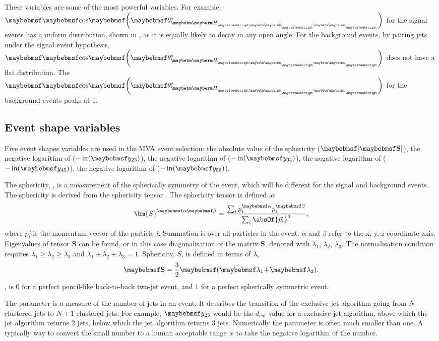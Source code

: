 These variables are some of the most powerful variables. For example, $\cosStar{\Hbb}$ for  the signal events has a unform distribution, shown in , as it is equally likely to decay in any open angle. For the background events, by pairing jets under the signal event hypothesis, $\cosStar{\Hbb}$ does not have a flat distribution. The  $\cosStar{\Hbb}$ for the background events peaks at 1.

\subsection{Event shape variables}

Five event shapes variables are used in the MVA event selection: the absolute value of the sphericity ($\abs{\sphericity}$), the negative logarithm of  ($-\ln(\y{23})$), the negative logarithm of  ($-\ln(\y{34})$), the negative logarithm of  ($-\ln(\y{45})$), the negative logarithm of  ($-\ln(\y{56})$).

The sphericity, \sphericity, is a measurement of the spherically symmetry of the event, which will be different for the signal and background events. The sphericity is  derived from the sphericity tensor \cite{PhysRevLett.35.1609}. The sphericity tensor is  defined as
\begin{equation}
{\bm{S}^{\alpha\beta}} = \frac{\sum_{i}p^{\alpha}_{i}p^{\beta}_{i}}{\sum_{i}\absOf{\vec{p_{i}}}^2},
\end{equation}
where $\vec{p_{i}}$ is the momentum vector of the particle $i$. Summation is over all particles in the event. $\alpha$ and $\beta$ refer to the x, y, z coordinate axis. Eigenvalues of tensor $\bm{S}$ can be found, or in this case diagonalisation of the matrix $\bm{S}$, denoted with $\lambda_{1}$, $\lambda_{2}$, $\lambda_{3}$. The normalisation condition requires $\lambda_{1}\!\geqslant\! \lambda_{2} \! \geqslant \! \lambda_{3}$ and $ \lambda_{1} \! + \! \lambda_{2} \! + \! \lambda_{3} \! = \! 1 $. Sphericity, $S$, is defined in terms of $\lambda$,
\begin{equation}
\sphericity = \frac{3}{2}\parenths{\lambda_{1} \! + \! \lambda_{2}}.
\end{equation}
\sphericity, is 0 for a perfect pencil-like back-to-back two-jet event, and 1 for a perfect spherically symmetric event.

The \y{} parameter is a measure of the number of jets in an event.  It describes the transition of  the exclusive jet algorithm going from $N$ clustered jets to $N\!+\!1$ clustered jets. For example, $\y{23}$ would be the $d_{cut}$ value for a exclusive jet algorithm, above which the jet algorithm returns 2 jets, below which the jet algorithm returns 3 jets. Numerically the \y{} parameter is often much smaller than one. A typically way to convert the small number to a human acceptable range is to take the negative logarithm of the number.

